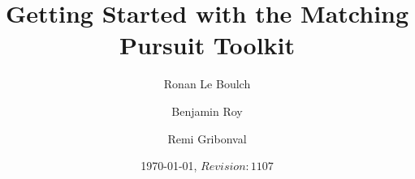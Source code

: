 \documentclass[11pt,a4paper]{report}
\title{Getting Started with the Matching Pursuit Toolkit}
\author{Ronan Le Boulch \and Benjamin Roy \and Remi Gribonval}
\date{\today, $Revision: 1107 $}
\begin{document}
\maketitle

\vfill

\tableofcontents

\vfill

\clearpage


\end{document}
